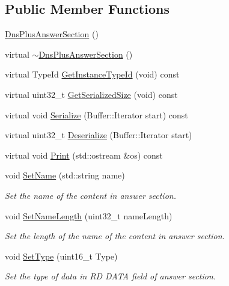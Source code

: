 \subsection*{Public Member Functions}
\begin{DoxyCompactItemize}
\item 
\hyperlink{classns3_1_1DnsPlusAnswerSection_aa1cb6dbcaa5dd169bb7059cb9e7f235f}{Dns\-Plus\-Answer\-Section} ()
\item 
virtual \hyperlink{classns3_1_1DnsPlusAnswerSection_ad0ace36d41761416f5920ef0126c3c1c}{$\sim$\-Dns\-Plus\-Answer\-Section} ()
\item 
virtual Type\-Id \hyperlink{classns3_1_1DnsPlusAnswerSection_a49405ae6e379132ec12836e371bc30ea}{Get\-Instance\-Type\-Id} (void) const 
\item 
virtual uint32\-\_\-t \hyperlink{classns3_1_1DnsPlusAnswerSection_a104fd989f35df0b3d4b85c33f73c864b}{Get\-Serialized\-Size} (void) const 
\item 
virtual void \hyperlink{classns3_1_1DnsPlusAnswerSection_a107a061aaef4face000adb7f3317f52e}{Serialize} (Buffer\-::\-Iterator start) const 
\item 
virtual uint32\-\_\-t \hyperlink{classns3_1_1DnsPlusAnswerSection_ad26bc4f46c7b59f1d296d903b3b88baf}{Deserialize} (Buffer\-::\-Iterator start)
\item 
virtual void \hyperlink{classns3_1_1DnsPlusAnswerSection_a34e5cbe940177587b43ba50d5586beee}{Print} (std\-::ostream \&os) const 
\item 
void \hyperlink{classns3_1_1DnsPlusAnswerSection_ab1fe1a8c00d52e81469d7edfa3d18b25}{Set\-Name} (std\-::string name)
\begin{DoxyCompactList}\small\item\em Set the name of the content in answer section. \end{DoxyCompactList}\item 
void \hyperlink{classns3_1_1DnsPlusAnswerSection_a4cfd46dc9b8003e1066d0501e2fefff4}{Set\-Name\-Length} (uint32\-\_\-t name\-Length)
\begin{DoxyCompactList}\small\item\em Set the length of the name of the content in answer section. \end{DoxyCompactList}\item 
void \hyperlink{classns3_1_1DnsPlusAnswerSection_a02c33fb6b02a6ace1f7a29e2df46960b}{Set\-Type} (uint16\-\_\-t Type)
\begin{DoxyCompactList}\small\item\em Set the type of data in R\-D D\-A\-T\-A field of answer section. \end{DoxyCompactList}\item 

\end{DoxyCompactItemize}
